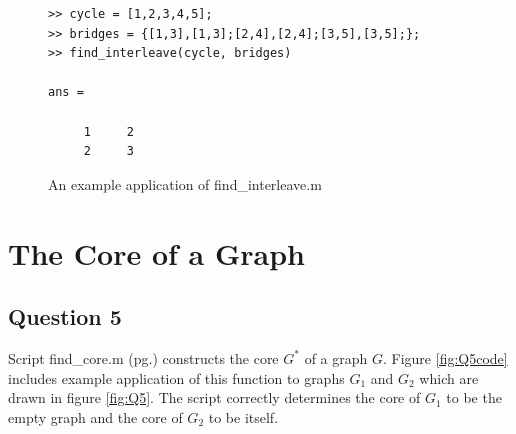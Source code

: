 \documentclass[a4paper]{article}
\begin{document}
\begin{figure}[H]
    \centering
    \begin{minipage}{0.65\textwidth}
        \centering
        \begin{verbatim}
>> cycle = [1,2,3,4,5];
>> bridges = {[1,3],[1,3];[2,4],[2,4];[3,5],[3,5];};
>> find_interleave(cycle, bridges)

ans =

     1     2
     2     3
        \end{verbatim}
    \end{minipage}\hfill
    \begin{minipage}{0.35\textwidth}
        \centering
    \end{minipage}
    \caption{An example application of find\_interleave.m}
    \label{fig:Q4}
\end{figure}

\section*{The Core of a Graph}

\subsection*{Question 5}

Script find\_core.m (pg.\pageref{Pfind_core}) constructs the core $G^*$ of a graph $G$. Figure \ref{fig:Q5code} includes example application of this function to graphs $G_1$ and $G_2$ which are drawn in figure \ref{fig:Q5}. The script correctly determines the core of $G_1$ to be the empty graph and the core of $G_2$ to be itself.
\end{document}
